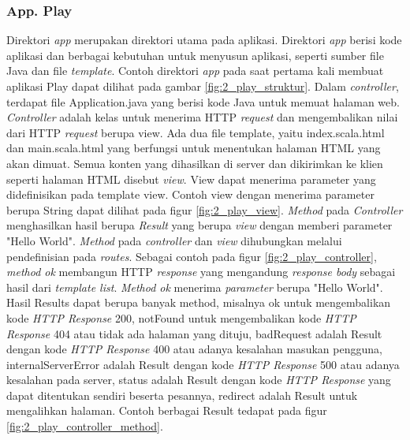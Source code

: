 \subsubsection{App. Play}
Direktori \textit{app} merupakan direktori utama pada aplikasi. Direktori \textit{app} berisi kode aplikasi dan berbagai kebutuhan untuk menyusun aplikasi, seperti sumber file Java dan file \textit{template}. Contoh direktori \textit{app} pada saat pertama kali membuat aplikasi Play dapat dilihat pada gambar \ref{fig:2_play_struktur}. Dalam \textit{controller}, terdapat file Application.java yang berisi kode Java untuk memuat halaman web. \textit{Controller} adalah kelas untuk menerima HTTP \textit{request} dan mengembalikan nilai dari HTTP \textit{request} berupa view. Ada dua file template, yaitu index.scala.html dan main.scala.html yang berfungsi untuk menentukan halaman HTML yang akan dimuat. Semua konten yang dihasilkan di server dan dikirimkan ke klien seperti halaman HTML disebut \textit{view}. View dapat menerima parameter yang didefinisikan pada template view. Contoh view dengan menerima parameter berupa String dapat dilihat pada figur \ref{fig:2_play_view}. \textit{Method} pada \textit{Controller} menghasilkan hasil berupa \textit{Result} yang berupa \textit{view} dengan memberi parameter "Hello World". \textit{Method} pada \textit{controller} dan \textit{view} dihubungkan melalui pendefinisian pada \textit{routes}. Sebagai contoh pada figur \ref{fig:2_play_controller}, \textit{method ok} membangun HTTP \textit{response} yang mengandung \textit{response body} sebagai hasil dari \textit{template list}. \textit{Method ok} menerima \textit{parameter} berupa "Hello World". Hasil Results dapat berupa banyak method, misalnya ok untuk mengembalikan kode \textit{HTTP Response} 200, notFound untuk mengembalikan kode \textit{HTTP Response} 404 atau tidak ada halaman yang dituju, badRequest adalah Result dengan kode \textit{HTTP Response} 400 atau adanya kesalahan masukan pengguna, internalServerError adalah Result dengan kode \textit{HTTP Response} 500 atau adanya kesalahan pada server, status adalah Result dengan kode \textit{HTTP Response} yang dapat ditentukan sendiri beserta pesannya, redirect adalah Result untuk mengalihkan halaman. Contoh berbagai Result tedapat pada figur \ref{fig:2_play_controller_method}.


